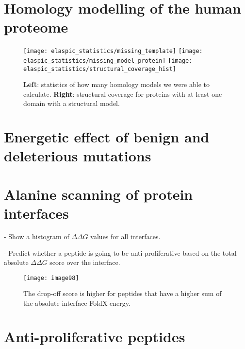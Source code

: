 

\section{Homology modelling of the human proteome}

\begin{figure}[H]
	\centering
	\texttt{[image: elaspic\_statistics/missing\_template]}
	\texttt{[image: elaspic\_statistics/missing\_model\_protein]}
	\texttt{[image: elaspic\_statistics/structural\_coverage\_hist]}
	\caption{\textbf{Left}: statistics of how many homology models we were able to calculate. \textbf{Right}: structural coverage for proteins with at least one domain with a structural model.}
\end{figure}



\section{Energetic effect of benign and deleterious mutations}



\section{Alanine scanning of protein interfaces}

- Show a histogram of $\Delta \Delta G$ values for all interfaces.

- Predict whether a peptide is going to be anti-proliferative based on the total absolute $\Delta \Delta G$ score over the interface.


\begin{figure}[H]
	\centering
	\texttt{[image: image98]}
	\caption[pipeline]{The drop-off score is higher for peptides that have a higher sum of the absolute interface FoldX energy.}
\end{figure}


\section{Anti-proliferative peptides}
